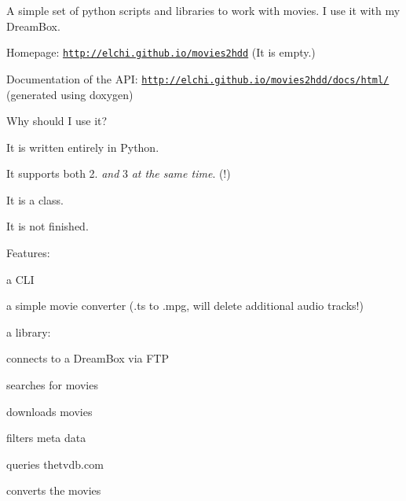 A simple set of python scripts and libraries to work with movies. I use it with my Dream\-Box.
\begin{DoxyItemize}
\item Homepage\-: \href{http://elchi.github.io/movies2hdd}{\tt http\-://elchi.\-github.\-io/movies2hdd} (It is empty.)
\item Documentation of the A\-P\-I\-: \href{http://elchi.github.io/movies2hdd/docs/html/}{\tt http\-://elchi.\-github.\-io/movies2hdd/docs/html/} (generated using doxygen) 


\end{DoxyItemize}

Why should I use it?
\begin{DoxyItemize}
\item It is written entirely in Python.
\item It supports both 2. {\itshape and} 3 {\itshape at the same time}. (!)
\item It is a class.
\item It is not finished. 


\end{DoxyItemize}

Features\-:
\begin{DoxyItemize}
\item a C\-L\-I
\item a simple movie converter (.ts to .mpg, will delete additional audio tracks!)
\item a library\-:
\begin{DoxyItemize}
\item connects to a Dream\-Box via F\-T\-P
\item searches for movies
\item downloads movies
\item filters meta data
\item queries thetvdb.\-com
\item converts the movies 
\end{DoxyItemize}
\end{DoxyItemize}